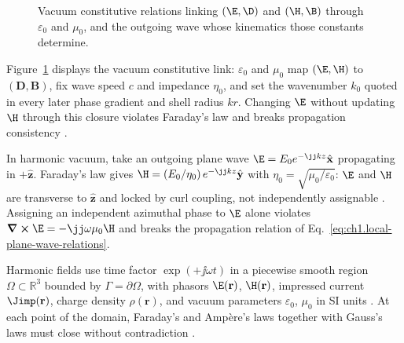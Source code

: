 \begin{figure}[t]
\centering
\VolIPhysFig{\VolIPhysVacuumClosureMap}
\caption{Vacuum constitutive relations linking $(\E,\D)$ and $(\H,\B)$ through $\varepsilon_0$ and $\mu_0$, and the outgoing wave whose kinematics those constants determine.}
\label{fig:ch1.vacuum-closure-map}
\end{figure}
Figure~\ref{fig:ch1.vacuum-closure-map} displays the vacuum constitutive link: $\varepsilon_0$ and
$\mu_0$ map $(\E,\H)$ to $(\mathbf{D},\mathbf{B})$, fix wave speed $c$ and impedance $\eta_0$,
and set the wavenumber $k_0$ quoted in every later phase gradient and shell radius $kr$. Changing $\E$ without updating $\H$ through this closure
violates Faraday's law and breaks propagation consistency \cite{maxwell1873,stratton1941}.

In harmonic vacuum, take an outgoing plane wave
$\E=E_0 e^{-\jj k z}\hat{\mathbf{x}}$ propagating in $+\hat{\mathbf{z}}$. Faraday's law gives
$\H=(E_0/\eta_0)\,e^{-\jj k z}\hat{\mathbf{y}}$ with $\eta_0=\sqrt{\mu_0/\varepsilon_0}$:
$\E$ and $\H$ are transverse to $\hat{\mathbf{z}}$ and locked by curl coupling, not independently assignable \cite{stratton1941,jackson1999}. Assigning an independent azimuthal phase to $\E$ alone violates $\curl\E=-\jj\omega\mu_0\H$ and breaks the propagation relation of Eq.~\eqref{eq:ch1.local-plane-wave-relations}.

Harmonic fields use time factor \(\exp(+\jj\omega t)\) in a piecewise smooth region
\(\Omega\subset\mathbb{R}^{3}\) bounded by \(\Gamma=\partial\Omega\), with phasors
\(\E(\mathbf{r})\), \(\H(\mathbf{r})\), impressed current \(\Jimp(\mathbf{r})\), charge density
\(\rho(\mathbf{r})\), and vacuum parameters \(\varepsilon_0\), \(\mu_0\) in SI units
\cite{stratton1941}. At each point of the domain, Faraday's and Amp\`ere's laws together with Gauss's laws must close without contradiction \cite{harrington2001,stratton1941}.

